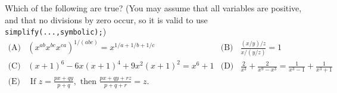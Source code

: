 \documentclass[a4paper,10pt]{amsbook}
\numberwithin{example}{chapter}
\begin{document}
\begin{exercise}\label{ex-truefalse}
 Which of the following are true?  (You may assume that all variables
 are positive, and that no divisions by zero occur, so it is valid to
 use \verb+simplify(...,symbolic);+)
 \[ \begin{array}{rlrl}
  \text{(A)} &
   (x^{ab}x^{bc}x^{ca})^{1/(abc)}=x^{1/a + 1/b + 1/c} &
  \text{(B)} &
   \frac{(x/y)/z}{x/(y/z)}=1 \\
  \text{(C)} & 
   (x+1)^6-6x(x+1)^4+9x^2(x+1)^2=x^6+1 &
  \text{(D)} &
   \frac{2}{x^3}+\frac{2}{x^9-x^3}=\frac{1}{x^3-1}+\frac{1}{x^3+1} \\
  \text{(E)} &
   \text{ If } z=\frac{px+qy}{p+q}, \text{ then }
      \frac{px+qy+rz}{p+q+r}=z. & & 
 \end{array} \]
\end{exercise}
\end{document}
